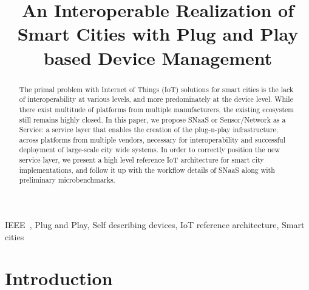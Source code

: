 \documentclass[conference]{IEEEtran}
\begin{document}
\title{An Interoperable Realization of Smart Cities with Plug and Play based Device Management}
\author{
}

\maketitle
\begin{abstract}
The primal problem with Internet of Things (IoT) solutions for smart cities is the lack of interoperability at various levels, and more predominately at the device level.
While there exist multitude of platforms from multiple manufacturers, the existing ecosystem still remains highly closed.
In this paper, we propose SNaaS or Sensor/Network as a Service: a service layer that enables the creation of the plug-n-play infrastructure, across platforms from multiple vendors, necessary for interoperability and successful deployment of large-scale city wide systems.
In order to correctly position the new service layer, we present a high level reference IoT architecture for smart city implementations, and follow it up with the workflow details of SNaaS along with preliminary microbenchmarks.
\end{abstract}

\begin{IEEEkeywords}
IEEE~, Plug and Play, Self describing devices, IoT reference architecture, Smart cities
\end{IEEEkeywords}

\section{Introduction}
\end{document}
